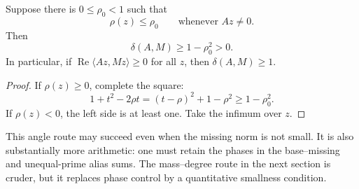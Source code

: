 \begin{proposition}
\label{prop:tpc60-uniform-angle-certificate}
Suppose there is \(0\le\rho_0<1\) such that
\begin{equation}
 \rho(z)\le\rho_0
 \qquad\text{whenever }Az\ne0.
 \label{eq:tpc60-uniform-angle-hypothesis}
\end{equation}
Then
\begin{equation}
 \boxed{
 \delta(A,M)\ge1-\rho_0^2>0.}
 \label{eq:tpc60-uniform-angle-bound}
\end{equation}
In particular, if
\(\operatorname{Re}\langle Az,Mz\rangle\ge0\) for all \(z\), then
\(\delta(A,M)\ge1\).
\end{proposition}

\begin{proof}
If \(\rho(z)\ge0\), complete the square:
\[
 1+t^2-2\rho t=(t-\rho)^2+1-\rho^2
 \ge1-\rho_0^2.
\]
If \(\rho(z)<0\), the left side is at least one.  Take the infimum over
\(z\).
\end{proof}

This angle route may succeed even when the missing norm is not small.  It
is also substantially more arithmetic: one must retain the phases in the
base--missing and unequal-prime alias sums.  The mass--degree route in the
next section is cruder, but it replaces phase control by a quantitative
smallness condition.
